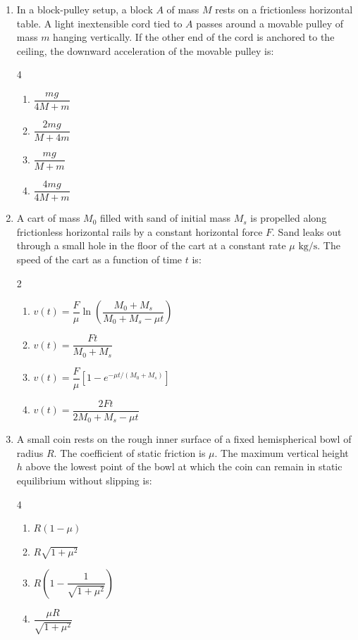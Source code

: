 \documentclass[11pt,a4paper]{article}
\begin{document}
\begin{enumerate}[label=\textbf{\arabic*.},leftmargin=18pt,itemsep=8pt,resume]
  \item In a block-pulley setup, a block $A$ of mass $M$ rests on a frictionless horizontal table. A light inextensible cord tied to $A$ passes around a movable pulley of mass $m$ hanging vertically. If the other end of the cord is anchored to the ceiling, the downward acceleration of the movable pulley is:
  \begin{multicols}{4}
    \begin{enumerate}[label=(\Alph*)]
      \item $\dfrac{mg}{4M + m}$
      \item $\dfrac{2mg}{M + 4m}$
      \item $\dfrac{mg}{M + m}$
      \item $\dfrac{4mg}{4M + m}$
    \end{enumerate}
  \end{multicols}

  \item A cart of mass $M_0$ filled with sand of initial mass $M_s$ is propelled along frictionless horizontal rails by a constant horizontal force $F$. Sand leaks out through a small hole in the floor of the cart at a constant rate $\mu\text{ kg/s}$. The speed of the cart as a function of time $t$ is:
  \begin{multicols}{2}
    \begin{enumerate}[label=(\Alph*)]
      \item $v(t) = \dfrac{F}{\mu}\ln\left(\dfrac{M_0 + M_s}{M_0 + M_s - \mu t}\right)$
      \item $v(t) = \dfrac{F t}{M_0 + M_s}$
      \item $v(t) = \dfrac{F}{\mu}\left[1 - e^{-\mu t / (M_0 + M_s)}\right]$
      \item $v(t) = \dfrac{2Ft}{2M_0 + M_s - \mu t}$
    \end{enumerate}
  \end{multicols}

  \item A small coin rests on the rough inner surface of a fixed hemispherical bowl of radius $R$. The coefficient of static friction is $\mu$. The maximum vertical height $h$ above the lowest point of the bowl at which the coin can remain in static equilibrium without slipping is:
  \begin{multicols}{4}
    \begin{enumerate}[label=(\Alph*)]
      \item $R(1 - \mu)$
      \item $R\sqrt{1 + \mu^2}$
      \item $R\left(1 - \dfrac{1}{\sqrt{1 + \mu^2}}\right)$
      \item $\dfrac{\mu R}{\sqrt{1 + \mu^2}}$
    \end{enumerate}
  \end{multicols}


\end{enumerate}
\end{document}
